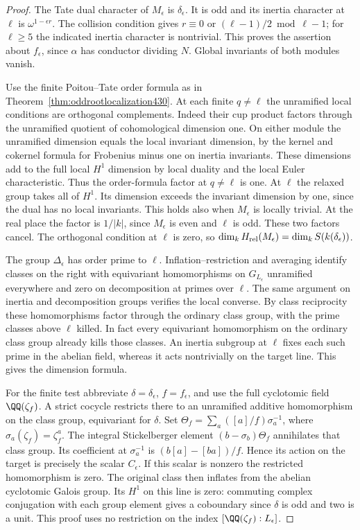 \documentclass[a4paper,11pt]{article}
\theoremstyle{definition}
\theoremstyle{remark}
\numberwithin{equation}{section}
\begin{document}
\begin{proof}
The Tate dual character of \(M_\epsilon\) is \(\delta_\epsilon\).
It is odd and its inertia character at \(\ell\) is
\(\omega^{1-\epsilon r}\). The collision condition gives
\(r\equiv0\) or \((\ell-1)/2\bmod\ell-1\); for \(\ell\ge5\)
the indicated inertia character is nontrivial. This proves the
assertion about \(f_\epsilon\), since \(\alpha\) has conductor
dividing \(N\). Global invariants of both modules vanish.

Use the finite Poitou--Tate order formula as in
Theorem~\ref{thm:oddrootlocalization430}. At each finite
\(q\ne\ell\) the unramified local conditions are orthogonal
complements. Indeed their cup product factors through the
unramified quotient of cohomological dimension one. On either
module the unramified dimension equals the local invariant
dimension, by the kernel and cokernel formula for Frobenius
minus one on inertia invariants. These dimensions add to the
full local \(H^1\) dimension by local duality and the local
Euler characteristic. Thus the order-formula factor at
\(q\ne\ell\) is one. At \(\ell\) the relaxed group takes all
of \(H^1\). Its dimension exceeds the invariant dimension
by one, since the dual has no local invariants. This holds
also when \(M_\epsilon\) is locally trivial. At the real place
the factor is \(1/|k|\), since \(M_\epsilon\) is even and
\(\ell\) is odd. These two factors cancel. The orthogonal
condition at \(\ell\) is zero, so
\(\dim_k H_{\rm rel}(M_\epsilon)=\dim_k S(k(\delta_\epsilon))\).

The group \(\Delta_\epsilon\) has order prime to \(\ell\).
Inflation--restriction and averaging identify classes on the
right with equivariant homomorphisms on \(G_{L_\epsilon}\)
unramified everywhere and zero on decomposition at primes
over \(\ell\). The same argument on inertia and decomposition
groups verifies the local converse. By class reciprocity these
homomorphisms factor through the ordinary class group, with
the prime classes above \(\ell\) killed. In fact every equivariant
homomorphism on the ordinary class group already kills those
classes. An inertia subgroup at \(\ell\) fixes each such prime
in the abelian field, whereas it acts nontrivially on the target
line. This gives the dimension formula.

For the finite test abbreviate \(\delta=\delta_\epsilon\),
\(f=f_\epsilon\), and use the full cyclotomic field
\(\QQ(\zeta_f)\). A strict cocycle restricts there to an
unramified additive homomorphism on the class group, equivariant
for \(\delta\). Set
\(\Theta_f=\sum_{a}([a]/f)\sigma_a^{-1}\), where
\(\sigma_a(\zeta_f)=\zeta_f^a\). The integral Stickelberger
element \((b-\sigma_b)\Theta_f\) annihilates that class group.
Its coefficient at \(\sigma_a^{-1}\) is
\((b[a]-[ba])/f\). Hence its action on the target is precisely
the scalar \(C_\epsilon\). If this scalar is nonzero the
restricted homomorphism is zero. The original class then
inflates from the abelian cyclotomic Galois group. Its
\(H^1\) on this line is zero: commuting complex conjugation
with each group element gives a coboundary since \(\delta\)
is odd and two is a unit. This proof uses no restriction on
the index \([\QQ(\zeta_f):L_\epsilon]\).


\end{proof}
\end{document}
